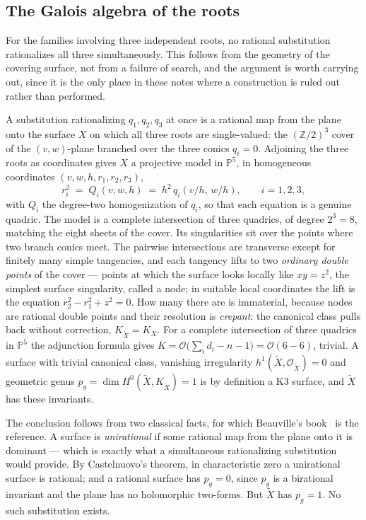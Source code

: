 \documentclass[11pt]{article}
\newcommand{\Z}{\mathbb{Z}}
\begin{document}
\subsection{The Galois algebra of the roots}
\label{sec:galois}

For the families involving three independent roots, no rational
substitution rationalizes all three simultaneously.  This follows
from the geometry of the covering surface, not from a failure of
search, and the argument is worth carrying out, since it is the only
place in these notes where a construction is ruled out rather than
performed.

A substitution rationalizing $q_1, q_2, q_3$ at once is a rational
map from the plane onto the surface $X$ on which all three roots are
single-valued: the $(\Z/2)^3$ cover of the $(v,w)$-plane branched
over the three conics $q_i = 0$.  Adjoining the three roots as
coordinates gives $X$ a projective model in $\mathbb{P}^5$, in
homogeneous coordinates $(v,w,h,r_1,r_2,r_3)$,
\begin{equation}
  r_i^2 \;=\; Q_i(v,w,h) \;=\; h^2\,q_i(v/h,\, w/h) ,
  \qquad i = 1,2,3 ,
\end{equation}
with $Q_i$ the degree-two homogenization of $q_i$, so that each
equation is a genuine quadric.  The model is a complete intersection
of three quadrics, of degree $2^3 = 8$, matching the eight sheets of
the cover.  Its singularities sit over the points where two branch
conics meet.  The pairwise intersections are transverse except for
finitely many simple tangencies, and each tangency lifts to two
\emph{ordinary double points} of the cover --- points at which the
surface looks locally like $xy = z^2$, the simplest surface
singularity, called a node; in suitable local coordinates the lift is
the equation $r_2^2 - r_1^2 + z^2 = 0$.  How many there are is
immaterial, because nodes are rational double points and their
resolution is \emph{crepant}: the canonical class pulls back without
correction, $K_{\widetilde X} = K_X$.  For a complete intersection of
three quadrics in $\mathbb{P}^5$ the adjunction formula gives
$K = \mathcal{O}\big(\sum_i d_i - n - 1\big) =
\mathcal{O}(6 - 6)$, trivial.  A surface with trivial canonical
class, vanishing irregularity
$h^1(\widetilde X, \mathcal{O}_{\widetilde X}) = 0$ and geometric genus
$p_g = \dim H^0(\widetilde X, K_{\widetilde X}) = 1$ is by definition
a K3 surface, and $\widetilde X$ has these invariants.

The conclusion follows from two classical facts, for which
Beauville's book~\cite{beauville} is the reference.  A surface is
\emph{unirational} if some rational map from the plane onto it is
dominant --- which is exactly what a simultaneous rationalizing
substitution would provide.  By Castelnuovo's theorem, in
characteristic zero a unirational surface is rational; and a rational
surface has $p_g = 0$, since $p_g$ is a birational invariant and the
plane has no holomorphic two-forms.  But $\widetilde X$ has
$p_g = 1$.  No such substitution exists.
\end{document}
